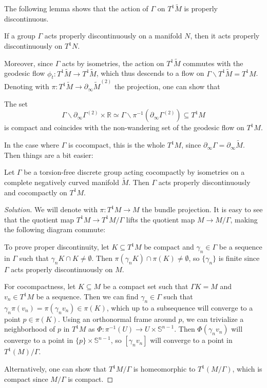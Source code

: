 \documentclass{report}
\begin{document}
The following lemma shows that the action of $\Gamma$ on $T^1 \tilde M$ is properly discontinuous.
\begin{lemma}
    If a group $\Gamma$ acts properly discontinuously on a manifold $N$, then it acts properly discontinuously on $T^1 N$.
\end{lemma}
Moreover, since $\Gamma$ acts by isometries, the action on $T^1 \tilde M$ commutes with the geodesic flow $\phi_t: T^1 \tilde M \to T^1 \tilde M$, which thus descends to a flow on $\Gamma \backslash T^1 \tilde M = T^1 M$.
Denoting with $\pi: T^1 \tilde M \to \partial_\infty \tilde M^{(2)}$ the projection, one can show that
\begin{fact}
The set 
\[
\Gamma \backslash \partial_\infty \Gamma^{(2)} \times \mathbb R \simeq \Gamma \backslash \pi^{-1}(\partial_\infty \Gamma^{(2)}) \subseteq T^1 M
\]
is compact and coincides with the non-wandering set of the geodesic flow on $T^1 M$.
\end{fact}
In the case where $\Gamma$ is cocompact, this is the whole $T^1 M$, since $\partial_\infty \Gamma = \partial_\infty \tilde M$.
Then things are a bit easier:
\begin{exercise}
Let $\Gamma$ be a torsion-free discrete group acting cocompactly by isometries on a complete negatively curved manifold $\tilde M$.
Then $\Gamma$ acts properly discontinuously and cocompactly on $T^1 M$.
\end{exercise}
\begin{proof}[Solution]
    We will denote with $\pi: T^1 M \to M$ the bundle projection.
    It is easy to see that the quotient map $T^1 M \to T^1 M / \Gamma$ lifts the quotient map $M \to M / \Gamma$, making the following diagram commute:
    \begin{center}
    \end{center}
    To prove proper discontinuity, let $K \subseteq T^1 M$ be compact and $\gamma_n \in \Gamma$ be a sequence in $\Gamma$ such that $\gamma_n K \cap K \neq \emptyset$.
    Then $\pi(\gamma_n K) \cap \pi(K) \neq \emptyset$, so $\{\gamma_n \}$ is finite since $\Gamma$ acts properly discontinuously on $M$.

    For cocompactness, let $K \subseteq M$ be a compact set such that $\Gamma K = M$ and $v_n \in T^1 M$ be a sequence.
    Then we can find $\gamma_n \in \Gamma$ such that $\gamma_n \pi(v_n) = \pi (\gamma_n v_n) \in \pi(K)$, which up to a subsequence will converge to a point $p \in \pi(K)$.
    Using an orthonormal frame around $p$, we can trivialize a neighborhood of $p$ in $T^1 M$ as $\Phi: \pi^{-1}(U) \to U \times \mathbb S^{n-1}$.
    Then $\Phi(\gamma_n v_n)$ will converge to a point in $\{p\} \times \mathbb S^{n-1}$, so $[\gamma_n v_n]$ will converge to a point in $T^1(M)/\Gamma$.

    Alternatively, one can show that $T^1 M / \Gamma$ is homeomorphic to $T^1(M/\Gamma)$, which is compact since $M/\Gamma$ is compact.
\end{proof}
\end{document}
